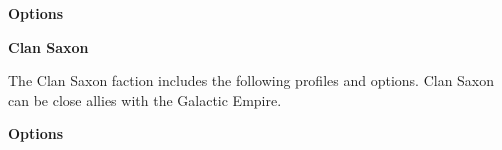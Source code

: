 \documentclass{article}
\begin{document}
{\large \textbf{Options}}
\vspace{0.3cm}
\begin{multicols}{2}
    {\scriptsize

    \setlength\extrarowheight{1.5pt}
    

    \vspace{0.6cm}

    \setlength\extrarowheight{1.5pt}
    

    \vspace{0.6cm}

    \setlength\extrarowheight{1.5pt}
    

    \vspace{0.6cm}

    \setlength\extrarowheight{1.5pt}
    

    \vspace{0.6cm}

    }
\end{multicols}
\vspace{0.6cm}

{\Large \textbf{Clan Saxon}}
\vspace{0.3cm}

\begin{minipage}{19cm}
    The Clan Saxon faction includes the following profiles and options.
    Clan Saxon can be close allies with the Galactic Empire.
\end{minipage}

\vspace{0.3cm}
{\scriptsize
\setlength\extrarowheight{1.5pt}

}
\vspace{0.6cm}

{\large \textbf{Options}}
\vspace{0.3cm}
\begin{multicols}{2}
    {\scriptsize

    \setlength\extrarowheight{1.5pt}
    

    \vspace{0.6cm}

    \setlength\extrarowheight{1.5pt}
    

    }
\end{multicols}
\vspace{0.6cm}
\end{document}
